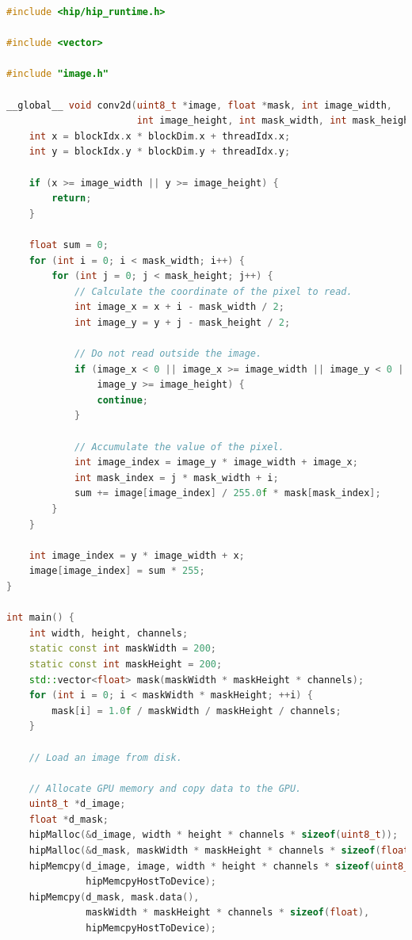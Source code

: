 \lstset{style=mystyle}
\begin{lstlisting}[language=c++,caption={HIP 平滑運算程式}]
#include <hip/hip_runtime.h>

#include <vector>

#include "image.h"

__global__ void conv2d(uint8_t *image, float *mask, int image_width,
                       int image_height, int mask_width, int mask_height) {
    int x = blockIdx.x * blockDim.x + threadIdx.x;
    int y = blockIdx.y * blockDim.y + threadIdx.y;

    if (x >= image_width || y >= image_height) {
        return;
    }

    float sum = 0;
    for (int i = 0; i < mask_width; i++) {
        for (int j = 0; j < mask_height; j++) {
            // Calculate the coordinate of the pixel to read.
            int image_x = x + i - mask_width / 2;
            int image_y = y + j - mask_height / 2;

            // Do not read outside the image.
            if (image_x < 0 || image_x >= image_width || image_y < 0 ||
                image_y >= image_height) {
                continue;
            }

            // Accumulate the value of the pixel.
            int image_index = image_y * image_width + image_x;
            int mask_index = j * mask_width + i;
            sum += image[image_index] / 255.0f * mask[mask_index];
        }
    }

    int image_index = y * image_width + x;
    image[image_index] = sum * 255;
}

int main() {
    int width, height, channels;
    static const int maskWidth = 200;
    static const int maskHeight = 200;
    std::vector<float> mask(maskWidth * maskHeight * channels);
    for (int i = 0; i < maskWidth * maskHeight; ++i) {
        mask[i] = 1.0f / maskWidth / maskHeight / channels;
    }

    // Load an image from disk.

    // Allocate GPU memory and copy data to the GPU.
    uint8_t *d_image;
    float *d_mask;
    hipMalloc(&d_image, width * height * channels * sizeof(uint8_t));
    hipMalloc(&d_mask, maskWidth * maskHeight * channels * sizeof(float));
    hipMemcpy(d_image, image, width * height * channels * sizeof(uint8_t),
              hipMemcpyHostToDevice);
    hipMemcpy(d_mask, mask.data(),
              maskWidth * maskHeight * channels * sizeof(float),
              hipMemcpyHostToDevice);


\end{lstlisting}
